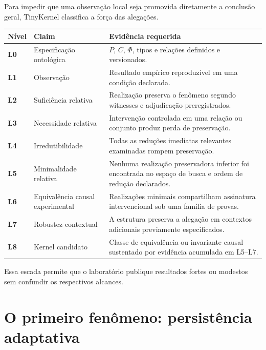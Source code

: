 \documentclass[11pt,a4paper]{article}
\begin{document}
Para impedir que uma observação local seja promovida diretamente a conclusão geral,
TinyKernel classifica a força das alegações.

\begin{longtable}{>{\bfseries}p{1.4cm}p{4.1cm}p{9.0cm}}
\toprule
Nível & Claim & Evidência requerida \\
\midrule
\endhead
L0 & Especificação ontológica &
$P$, $C$, $\Phi$, tipos e relações definidos e versionados. \\

L1 & Observação &
Resultado empírico reproduzível em uma condição declarada. \\

L2 & Suficiência relativa &
Realização preserva o fenômeno segundo witnesses e adjudicação preregistrados. \\

L3 & Necessidade relativa &
Intervenção controlada em uma relação ou conjunto produz perda de preservação. \\

L4 & Irredutibilidade &
Todas as reduções imediatas relevantes examinadas rompem preservação. \\

L5 & Minimalidade relativa &
Nenhuma realização preservadora inferior foi encontrada no espaço de busca e ordem
de redução declarados. \\

L6 & Equivalência causal experimental &
Realizações minimais compartilham assinatura intervencional sob uma família de provas. \\

L7 & Robustez contextual &
A estrutura preserva a alegação em contextos adicionais previamente especificados. \\

L8 & Kernel candidato &
Classe de equivalência ou invariante causal sustentado por evidência acumulada em
L5--L7. \\
\bottomrule
\end{longtable}

Essa escada permite que o laboratório publique resultados fortes ou modestos sem
confundir os respectivos alcances.

\section{O primeiro fenômeno: persistência adaptativa}
\end{document}
